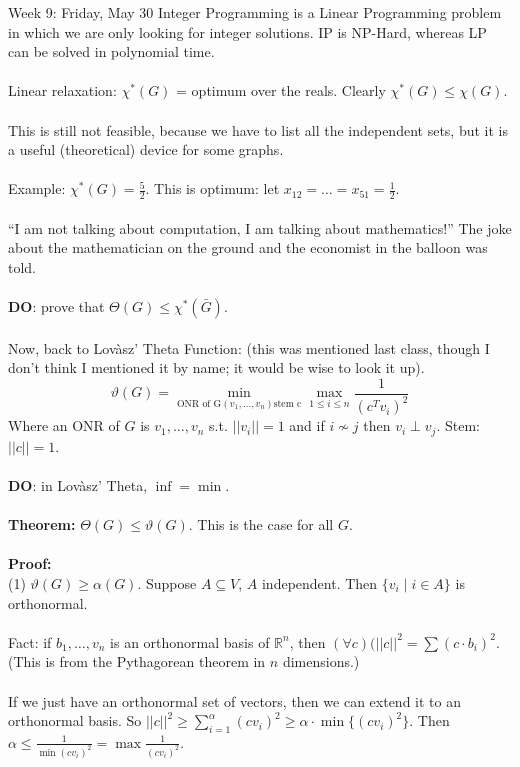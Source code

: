\documentclass[12pt]{article}
\theoremstyle{remark}
\newcommand{\R}{\mathbb{R}}
\begin{document}
\begin{section}{Week 9: Friday, May 30}
Integer Programming is a Linear Programming problem in which we are only looking for integer solutions. IP is NP-Hard, whereas LP can be solved in polynomial time.
\\\\
Linear relaxation: $\chi^*(G)$ = optimum over the reals. Clearly $\chi^*(G) \leq \chi(G)$.
\\\\
This is still not feasible, because we have to list all the independent sets, but it is a useful (theoretical) device for some graphs.
\\\\
Example: $\chi^*(G) = \frac 5 2$. This is optimum: let $x_{12} = \ldots = x_{51} = \frac 1 2$.
\\\\
``I am not talking about computation, I am talking about mathematics!'' The joke about the mathematician on the ground and the economist in the balloon was told.
\\\\
\textbf{DO}: prove that $\Theta(G) \leq \chi^*(\bar G)$.
\\\\
Now, back to Lov{\`a}sz' Theta Function: (this was mentioned last class, though I don't think I mentioned it by name; it would be wise to look it up).
$$\vartheta (G) = \min_{\text{ONR of G} (v_1,\ldots,v_n)\text{stem c}} \max_{1 \leq i \leq n} \frac 1 {(c^Tv_i)^2}$$
Where an ONR of $G$ is $v_1,\ldots,v_n$ s.t. $||v_i|| = 1$ and if $i \not \sim j$ then $v_i \perp v_j$. Stem: $||c|| = 1$.
\\\\
\textbf{DO}: in Lov{\`a}sz' Theta, $\inf = \min$. 
\\\\
\textbf{Theorem:} $\Theta(G) \leq \vartheta(G)$. This is the case for all $G$.
\\\\
\textbf{Proof:}
\\(1) $\vartheta(G) \geq \alpha(G)$. Suppose $A \subseteq V$, $A$ independent. Then $\{v_i \mid i \in A\}$ is orthonormal.
\\\\
Fact: if $b_1,\ldots,v_n$ is an orthonormal basis of $\R^n$, then $(\forall c)(||c||^2 = \sum (c \cdot b_i)^2$. (This is from the Pythagorean theorem in $n$ dimensions.)
\\\\
If we just have an orthonormal set of vectors, then we can extend it to an orthonormal basis. So $||c||^2 \geq \sum_{i=1}^\alpha (c v_i)^2 \geq \alpha \cdot \min \{ ( cv_i)^2\}$. Then $\alpha \leq \frac{1}{\min (c v_i)^2} = \max \frac{1}{(c v_i)^2}$.

\end{section}
\end{document}
